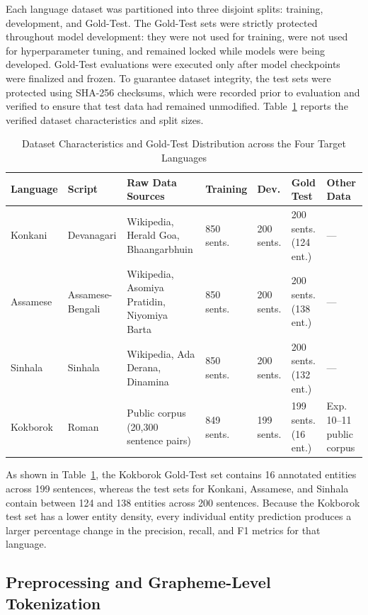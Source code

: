 \documentclass[pdflatex,sn-mathphys-num]{sn-jnl}
\begin{document}
Each language dataset was partitioned into three disjoint splits: training, development, and Gold-Test. The Gold-Test sets were strictly protected throughout model development: they were not used for training, were not used for hyperparameter tuning, and remained locked while models were being developed. Gold-Test evaluations were executed only after model checkpoints were finalized and frozen. To guarantee dataset integrity, the test sets were protected using SHA-256 checksums, which were recorded prior to evaluation and verified to ensure that test data had remained unmodified. Table~\ref{tab:dataset} reports the verified dataset characteristics and split sizes.

\begin{table}[htbp]
\centering
\caption{Dataset Characteristics and Gold-Test Distribution across the Four Target Languages}
\label{tab:dataset}
\small
\begin{tabular}{lllllll}
\toprule
\textbf{Language} & \textbf{Script} & \textbf{Raw Data Sources} & \textbf{Training} & \textbf{Dev.} & \textbf{Gold Test} & \textbf{Other Data} \\
\midrule
Konkani  & Devanagari       & Wikipedia, Herald Goa, Bhaangarbhuin & 850 sents. & 200 sents. & 200 sents. (124 ent.) & --- \\
Assamese & Assamese-Bengali & Wikipedia, Asomiya Pratidin, Niyomiya Barta & 850 sents. & 200 sents. & 200 sents. (138 ent.) & --- \\
Sinhala  & Sinhala          & Wikipedia, Ada Derana, Dinamina & 850 sents. & 200 sents. & 200 sents. (132 ent.) & --- \\
Kokborok & Roman            & Public corpus (20,300 sentence pairs) & 849 sents. & 199 sents. & 199 sents. (16 ent.)  & Exp. 10--11 public corpus \\
\bottomrule
\end{tabular}
\end{table}

As shown in Table~\ref{tab:dataset}, the Kokborok Gold-Test set contains 16 annotated entities across 199 sentences, whereas the test sets for Konkani, Assamese, and Sinhala contain between 124 and 138 entities across 200 sentences. Because the Kokborok test set has a lower entity density, every individual entity prediction produces a larger percentage change in the precision, recall, and F1 metrics for that language.

\subsection{Preprocessing and Grapheme-Level Tokenization}\label{subsec:preprocessing}
\end{document}
